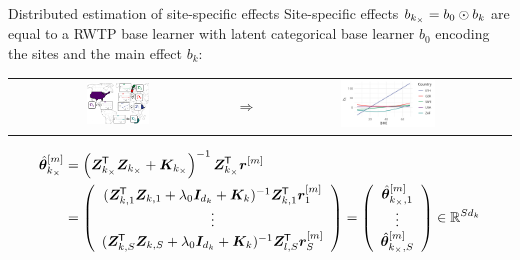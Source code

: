 \documentclass[t,10pt]{beamer}
\newcommand{\penMat}{\bm{K}}
\newcommand{\idMat}{\bm{I}}
\begin{document}
\begin{frame}{Distributed estimation of site-specific effects}
  Site-specific effects $b_{k_\times} = b_0 \odot b_k$ are equal to a RWTP base learner with latent categorical base learner $b_0$ encoding the sites and the main effect $b_k$:
  \begin{center}
  \begin{tabular}{ccc}
    \includegraphics[align=c,width=0.3\textwidth]{figures/fig-site-effects.png} &
    {\Large $\Rightarrow$} &
    \includegraphics[align=c,width=0.4\textwidth]{figures/bs-tensor/fig-cat-num.png} \\
  \end{tabular}
  \end{center}
  \begin{align*}
    \tbmh_{\lsite}
    &= \left(\design_{\lsite}^\tran \design_{\lsite} +  \penMat_{\lsite}\right)^{-1}\design_{\lsite}^\tran \rmm
    \notag \\
    &= \left(\begin{array}{c}
         (\design_{\blk,1}^\tran \design_{\blk,1} + \lambda_0\idMat_{d_\blk} + \penMat_\blk)^{-1} \design_{\blk,1}^\tran \rmm_1 \\
         \vdots \\
         (\design_{\blk,\nSites}^\tran \design_{\blk,\nSites} + \lambda_0\idMat_{d_\blk} + \penMat_\blk)^{-1} \design_{l,\nSites}^\tran \rmm_\nSites
    \end{array}\right) =
    \left(\begin{array}{c}
      \tbmh_{{\lsite}, 1}  \\
      \vdots \\
      \tbmh_{{\lsite}, \nSites}
    \end{array}\right)\in\R^{Sd_k}
  \end{align*}
\end{frame}
\end{document}
